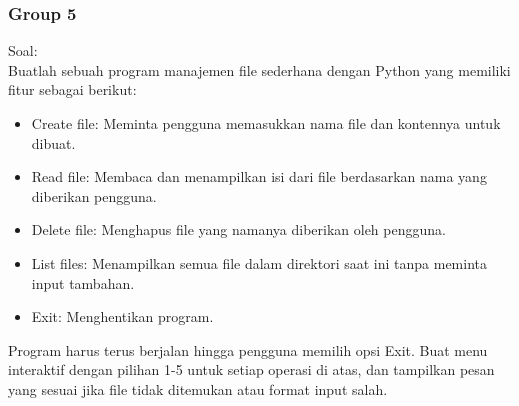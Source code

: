 \documentclass[12pt]{article}
\begin{document}
\subsubsection{Group 5}
Soal:\\
Buatlah sebuah program manajemen file sederhana dengan Python yang memiliki fitur sebagai berikut:
\begin{itemize}
    \item Create file: Meminta pengguna memasukkan nama file dan kontennya untuk dibuat.
    \item Read file: Membaca dan menampilkan isi dari file berdasarkan nama yang diberikan pengguna.
    \item Delete file: Menghapus file yang namanya diberikan oleh pengguna.
    \item List files: Menampilkan semua file dalam direktori saat ini tanpa meminta input tambahan.
    \item Exit: Menghentikan program.
\end{itemize}
Program harus terus berjalan hingga pengguna memilih opsi Exit. Buat menu interaktif dengan pilihan 1-5 untuk setiap operasi di atas, dan tampilkan pesan yang sesuai jika file tidak ditemukan atau format input salah.
\end{document}

